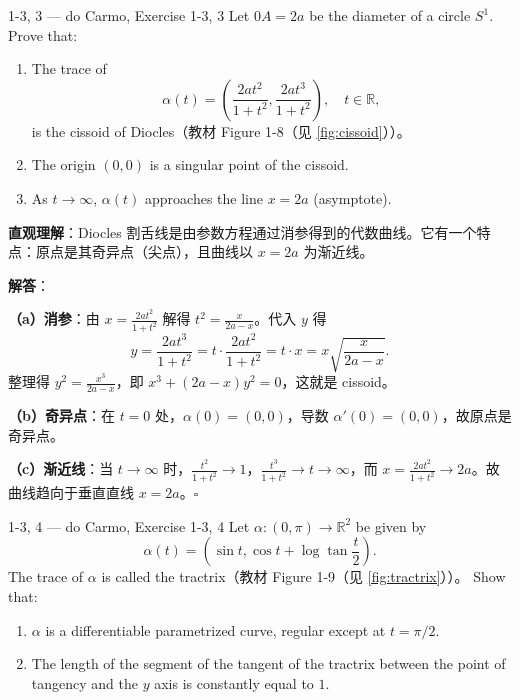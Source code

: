 \begin{exercise}{1-3, 3 — do Carmo, Exercise 1-3, 3}
Let $0A = 2a$ be the diameter of a circle $S^1$. Prove that:
\begin{enumerate}
\item[a.] The trace of
\[
\alpha(t) = \left(\frac{2at^2}{1+t^2}, \frac{2at^3}{1+t^2}\right),\quad t \in \mathbb{R},
\]
is the cissoid of Diocles（教材 Figure 1-8（见 \cref{fig:cissoid}））。
\item[b.] The origin $(0,0)$ is a singular point of the cissoid.
\item[c.] As $t \to \infty$, $\alpha(t)$ approaches the line $x = 2a$ (asymptote).
\end{enumerate}
\end{exercise}

\begin{solution}
\textbf{直观理解}：Diocles 割舌线是由参数方程通过消参得到的代数曲线。它有一个特点：原点是其奇异点（尖点），且曲线以 $x=2a$ 为渐近线。

\textbf{解答}：

\textbf{（a）消参}：由 $x = \frac{2at^2}{1+t^2}$ 解得 $t^2 = \frac{x}{2a-x}$。代入 $y$ 得
\[
y = \frac{2at^3}{1+t^2} = t \cdot \frac{2at^2}{1+t^2} = t \cdot x = x\sqrt{\frac{x}{2a-x}}.
\]
整理得 $y^2 = \frac{x^3}{2a-x}$，即 $x^3 + (2a-x)y^2 = 0$，这就是 cissoid。

\textbf{（b）奇异点}：在 $t=0$ 处，$\alpha(0) = (0, 0)$，导数 $\alpha'(0) = (0, 0)$，故原点是奇异点。

\textbf{（c）渐近线}：当 $t \to \infty$ 时，$\frac{t^2}{1+t^2} \to 1$，$\frac{t^3}{1+t^2} \to t \to \infty$，而 $x = \frac{2at^2}{1+t^2} \to 2a$。故曲线趋向于垂直直线 $x = 2a$。$\square$
\end{solution}

\begin{exercise}{1-3, 4 — do Carmo, Exercise 1-3, 4}
Let $\alpha: (0, \pi) \to \mathbb{R}^2$ be given by
\[
\alpha(t) = \left(\sin t, \cos t + \log \tan \frac{t}{2}\right).
\]
The trace of $\alpha$ is called the tractrix（教材 Figure 1-9（见 \cref{fig:tractrix}））。 Show that:
\begin{enumerate}
\item[a.] $\alpha$ is a differentiable parametrized curve, regular except at $t = \pi/2$.
\item[b.] The length of the segment of the tangent of the tractrix between the point of tangency and the $y$ axis is constantly equal to $1$.
\end{enumerate}
\end{exercise}

